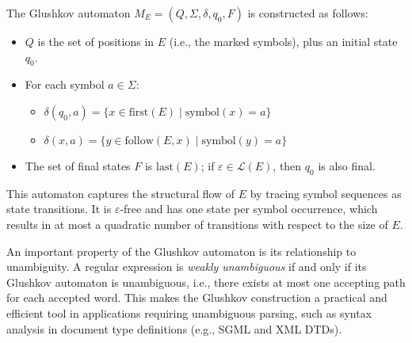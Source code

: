 The Glushkov automaton $M_E = (Q, \Sigma, \delta, q_0, F)$ is constructed as follows:

\begin{itemize}
    \item $Q$ is the set of positions in $E$ (i.e., the marked symbols), plus an initial state $q_0$.
    \item For each symbol $a \in \Sigma$:
    \begin{itemize}
        \item $\delta(q_0, a) = \{ x \in \text{first}(E) \mid \text{symbol}(x) = a \}$
        \item $\delta(x, a) = \{ y \in \text{follow}(E, x) \mid \text{symbol}(y) = a \}$
    \end{itemize}
    \item The set of final states $F$ is $\text{last}(E)$; if $\varepsilon \in \mathcal{L}(E)$, then $q_0$ is also final.
\end{itemize}

This automaton captures the structural flow of $E$ by tracing symbol sequences as state transitions. It is $\varepsilon$-free and has one state per symbol occurrence, which results in at most a quadratic number of transitions with respect to the size of $E$.

An important property of the Glushkov automaton is its relationship to unambiguity. A regular expression is \emph{weakly unambiguous} if and only if its Glushkov automaton is unambiguous, i.e., there exists at most one accepting path for each accepted word. This makes the Glushkov construction a practical and efficient tool in applications requiring unambiguous parsing, such as syntax analysis in document type definitions (e.g., SGML and XML DTDs).





